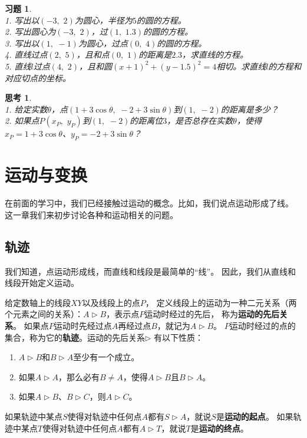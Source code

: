 \documentclass[12pt,UTF8]{ctexbook}
\newtheorem{sk}{思考}[section]
\newtheorem{xt}{习题}[section]
\begin{document}
\begin{xt}
    \mbox{}\\
    1. 写出以$(-3, \,\,2)$为圆心，半径为$5$的圆的方程。\\
    2. 写出圆心为$(-3, \,\,2)$，过$(1,\,\, 1.3)$的圆的方程。\\
    3. 写出以$(1, \,\,-1)$为圆心，过点$(0,\,\, 4)$的圆的方程。\\
    4. 直线过点$(2,\,\,5)$，且和点$(0,\,\,1)$的距离是$2.3$，求直线的方程。\\
    5. 直线$l$过点$(4,\,\,2)$，且和圆$(x+1)^2 + (y - 1.5)^2 = 4$相切。求直线$l$的方程和对应切点的坐标。
\end{xt}

\begin{sk}
    \mbox{}\\
    1. 给定实数$\theta$，点$(1 + 3\cos\theta, \,\, -2 + 3\sin\theta)$到$(1, \,\,-2)$的距离是多少？\\
    2. 如果点$P(x_P, \,\,y_P)$到$(1, \,\,-2)$的距离位$3$，是否总存在实数$\theta$，使得$x_P = 1 + 3\cos\theta$、$y_P = -2 + 3\sin\theta$？
\end{sk}

\chapter{运动与变换}
在前面的学习中，我们已经接触过运动的概念。比如，我们说点运动形成了线。
这一章我们来初步讨论各种和运动相关的问题。

\section{轨迹}
我们知道，点运动形成线，而直线和线段是最简单的“线”。
因此，我们从直线和线段开始定义运动。

给定数轴上的线段$XY$以及线段上的点$P$，
定义线段上的运动为一种二元关系（两个元素之间的关系）：$A \triangleright B$，表示点$P$运动时经过的先后，
称为\textbf{运动的先后关系}。
如果点$P$运动时先经过点$A$再经过点$B$，就记为$A \triangleright B$。
$P$运动时经过的点的集合，称为它的\textbf{轨迹}。运动的先后关系$\triangleright$
有以下性质：
\begin{enumerate}
    \item $A \triangleright B$和$B \triangleright A$至少有一个成立。
    \item 如果$A \triangleright A$，那么必有$B\neq A$，使得$A \triangleright B$且$B \triangleright A$。
    \item 如果$A \triangleright B$、$B \triangleright C$，则$A \triangleright C$。
\end{enumerate}
如果轨迹中某点$S$使得对轨迹中任何点$A$都有$S \triangleright A$，就说$S$是\textbf{运动的起点}。
如果轨迹中某点$T$使得对轨迹中任何点$A$都有$A \triangleright T$，就说$T$是\textbf{运动的终点}。
\end{document}
